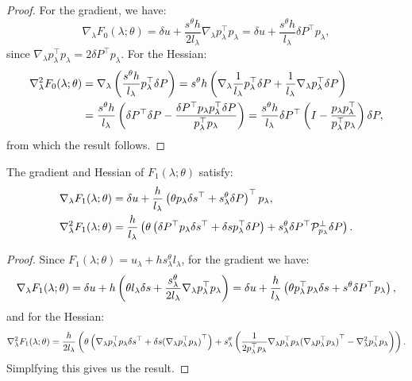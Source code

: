 \documentclass[eikonal.tex]{subfiles}
\begin{document}
\begin{proof}
  For the gradient, we have:
  \begin{equation*}
    \nabla_\lambda F_0(\lambda; \theta) = \delta u + \frac{s^{\theta} h}{2 l_\lambda} \nabla_\lambda p_\lambda^\top p_\lambda = \delta u + \frac{s^{\theta} h}{l_\lambda} \delta P^\top p_\lambda,
  \end{equation*}
  since
  $\nabla_\lambda p_\lambda^\top p_\lambda = 2 \delta P^\top
  p_\lambda$. For the Hessian:
  \begin{align*}
    \nabla^2_\lambda F_0(\lambda; \theta) &= \nabla_\lambda \left(\frac{s^{\theta} h}{l_\lambda} p_\lambda^\top \delta P\right) = s^{\theta} h \left(\nabla_\lambda \frac{1}{l_\lambda} p_\lambda^\top \delta P + \frac{1}{l_\lambda} \nabla_\lambda p_\lambda^\top \delta P\right) \\
    &= \frac{s^{\theta} h}{l_\lambda} \left(\delta P^\top \delta P - \frac{\delta P^\top p_\lambda p_\lambda^\top \delta P}{p_\lambda^\top p_\lambda}\right) = \frac{s^{\theta} h}{l_\lambda} \delta P^\top \left(I - \frac{p_\lambda p_\lambda^\top}{p_\lambda^\top p_\lambda}\right) \delta P,
  \end{align*}
  from which the result follows.
\end{proof}

\begin{lemma}\label{lemma:F1-grad-and-Hess}
  The gradient and Hessian of $F_1(\lambda; \theta)$ satisfy:
  \begin{align}
    \nabla_\lambda F_1(\lambda; \theta) &= \delta u + \frac{h}{l_\lambda} \left(\theta p_\lambda \delta s^\top + s^{\theta}_\lambda \delta P\right)^\top p_\lambda, \\
    \nabla_\lambda^2 F_1(\lambda; \theta) &= \frac{h}{l_\lambda} \left(\theta \left(\delta P^\top p_\lambda \delta s^\top + \delta s p_\lambda^\top \delta P\right) + s^{\theta}_\lambda \delta P^\top \mathcal{P}^\perp_{p_\lambda} \delta P\right). \label{eq:hess-F1}
  \end{align}
\end{lemma}

\begin{proof}
  Since $F_1(\lambda; \theta) = u_\lambda + h s^{\theta}_\lambda l_\lambda$, for the gradient we have:
  \begin{equation*}
    \nabla_\lambda F_1(\lambda; \theta) = \delta u + h \left(\theta l_\lambda \delta s + \frac{s^{\theta}_\lambda}{2l_\lambda} \nabla_\lambda p_\lambda^\top p_\lambda\right) = \delta u + \frac{h}{l_\lambda} \left(\theta p_\lambda^\top p_\lambda \delta s + s^{\theta} \delta P^\top p_\lambda\right),
  \end{equation*}
  and for the Hessian:
  \begin{equation*}
    \nabla_\lambda^2 F_1(\lambda; \theta) = \frac{h}{2 l_\lambda} \left(\theta \left(\nabla_\lambda p_\lambda^\top p_\lambda \delta s^\top + \delta s {(\nabla_\lambda p_\lambda^\top p_\lambda)}^\top\right) + s^{\theta}_\lambda \left(\frac{1}{2 p_\lambda^\top p_\lambda} \nabla_\lambda p_\lambda^\top p_\lambda {(\nabla_\lambda p_\lambda^\top p_\lambda)}^\top - \nabla^2_\lambda p_\lambda^\top p_\lambda\right)\right).
  \end{equation*}
  Simplfying this gives us the result.
\end{proof}
\end{document}
